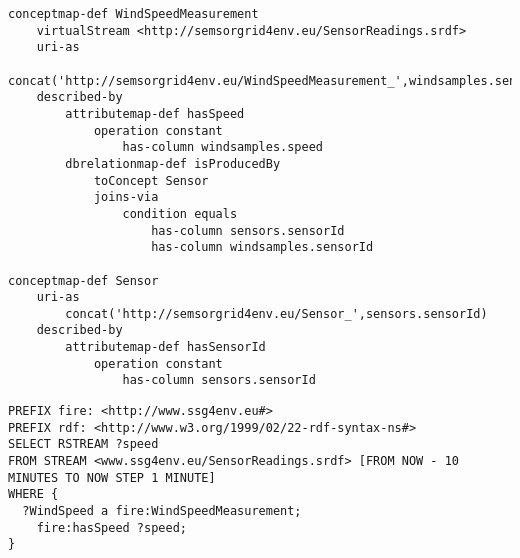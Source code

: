 \begin{lstlisting}[style=R2OStyle,language=R2O,frame=none,float,label=list:s2o-wind-ex,caption=\stwoo mapping from the data stream \textsf{windsamples} to the ontology concepts $WindSpeedMeasurement$.]
conceptmap-def WindSpeedMeasurement
	virtualStream <http://semsorgrid4env.eu/SensorReadings.srdf>
	uri-as
		concat('http://semsorgrid4env.eu/WindSpeedMeasurement_',windsamples.sensorId,windsamples.ts)
	described-by
		attributemap-def hasSpeed
			operation constant
				has-column windsamples.speed
		dbrelationmap-def isProducedBy
			toConcept Sensor
			joins-via
				condition equals
					has-column sensors.sensorId
					has-column windsamples.sensorId

conceptmap-def Sensor
	uri-as
		concat('http://semsorgrid4env.eu/Sensor_',sensors.sensorId)
	described-by
		attributemap-def hasSensorId
			operation constant
				has-column sensors.sensorId
\end{lstlisting}


\begin{lstlisting}[style=SPARQLSTRStyle,language=SPARQLSTR,frame=none,float,label=
list:query-example,caption=\sparqlstr query which every minute returns the wind speed for the last ten minutes.]
PREFIX fire: <http://www.ssg4env.eu#>
PREFIX rdf: <http://www.w3.org/1999/02/22-rdf-syntax-ns#>
SELECT RSTREAM ?speed
FROM STREAM <www.ssg4env.eu/SensorReadings.srdf> [FROM NOW - 10 MINUTES TO NOW STEP 1 MINUTE]
WHERE {
  ?WindSpeed a fire:WindSpeedMeasurement;
    fire:hasSpeed ?speed;
}
\end{lstlisting}


